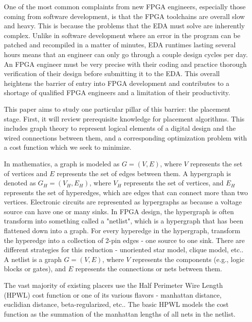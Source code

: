 \documentclass{article}
\begin{document}
One of the most common complaints from new FPGA engineers, especially those coming from software development, is that the FPGA toolchains are overall slow and heavy.
This is because the problems that the EDA must solve are inherently complex.
Unlike in software development where an error in the program can be patched and recompiled in a matter of minutes, EDA runtimes lasting several hours means that an engineer can only go through a couple design cycles per day. 
An FPGA engineer must be very precise with their coding and practice thorough verification of their design before submitting it to the EDA.
This overall heightens the barrier of entry into FPGA development and contributes to a shortage of qualified FPGA engineers and a limitation of their productivity. 

This paper aims to study one particular pillar of this barrier: the placement stage. 
First, it will review prerequisite knowledge for placement algorithms. 
This includes graph theory to represent logical elements of a digital design and the wired connections between them, and a corresponding optimization problem with a cost function which we seek to minimize. 

In mathematics, a graph is modeled as \( G = (V, E) \), where \( V \) represents the set of vertices and \( E \) represents the set of edges between them.
A hypergraph is denoted as \( G_{H} = (V_{H}, E_{H}) \), where \( V_{H} \) represents the set of vertices, and \( E_{H} \) represents the set of hyperedges, which are edges that can connect more than two vertices.
Electronic circuits are represented as hypergraphs as because a voltage source can have one or many sinks. 
In FPGA design, the hypergraph is often transform into something called a "netlist", which is a hypergraph that has been flattened down into a graph. 
For every hyperedge in the hypergraph, transform the hyperedge into a collection of 2-pin edges - one source to one sink.
There are different strategies for this reduction - unoriented star model, clique model, etc.. 
A netlist is a graph \( G = (V, E) \), where \( V \) represents the components (e.g., logic blocks or gates), and \( E \) represents the connections or nets between them.

The vast majority of existing placers use the Half Perimeter Wire Length (HPWL) cost function or one of its various flavors - manhattan distance, euclidian distance, beta-regularized, etc..
The basic HPWL models the cost function as the summation of the manhattan lengths of all nets in the netlist. 
\end{document}
